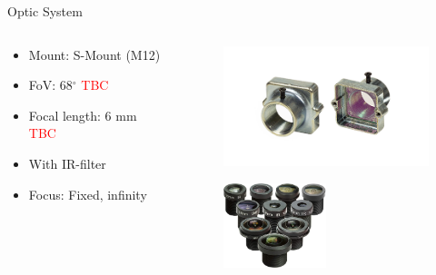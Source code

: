 \begin{frame}{Optic System}

    \begin{columns}[t]
        \begin{column}[t]{0.5\textwidth}
            \vspace{1.2cm}
            \begin{itemize}
                \item Mount: S-Mount (M12)
                \vspace{0.2cm}
                \item FoV: 68$^{\circ}$ \textcolor{red}{TBC}
                \vspace{0.2cm}
                \item Focal length: 6 mm \textcolor{red}{TBC}
                \vspace{0.2cm}
                \item With IR-filter
                \vspace{0.2cm}
                \item Focus: Fixed, infinity
            \end{itemize}
        \end{column}
        \begin{column}[t]{0.5\textwidth}
            \begin{figure}[!ht]
                \begin{center}
                    \includegraphics[width=6cm]{figures/m12-mounting.png}
                \end{center}
            \end{figure}
            \begin{figure}[!ht]
                \begin{center}
                    \includegraphics[width=3cm]{figures/m12-lens.jpg}
                \end{center}
            \end{figure}
        \end{column}
    \end{columns}

\end{frame}

